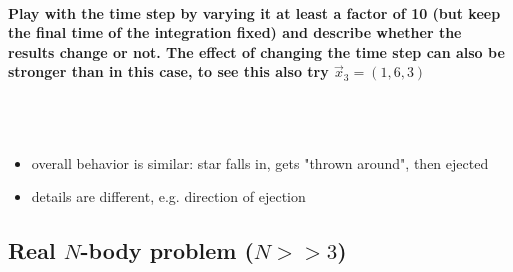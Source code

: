     \paragraph{Play with the time step by varying it at least a factor of 10 
        (but keep the final time of the integration fixed) and describe whether 
        the results change or not. The effect of changing the time step can 
        also be stronger than in this case, to see this also try 
        $\vec x_3=(1,6,3)$
    } \ \\
        \\
        \begin{itemize}
            \item overall behavior is similar: star falls in, gets 
                "thrown around", then ejected
            \item details are different, e.g. direction of ejection
        \end{itemize}

\newpage
\subsection{Real $N$-body problem ($N>>3$)}
